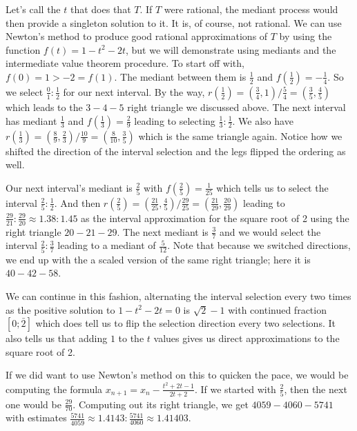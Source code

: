 \documentclass[12pt]{article}
\begin{document}
Let's call the $t$ that does that $T$. If $T$ were rational, the mediant process would then provide a singleton solution to it. It is, of course, not rational. We can use Newton's method to produce good rational approximations of $T$ by using the function $f(t) = 1-t^2 - 2t$, but we will demonstrate using mediants and the intermediate value theorem procedure. To start off with, $f(0) = 1 > -2 = f(1)$. The mediant between them is $\frac{1}{2}$ and $f(\frac{1}{2}) = -\frac{1}{4}$. So we select $\frac{0}{1}:\frac{1}{2}$ for our next interval. By the way, $r(\frac{1}{2}) = (\frac{3}{4}, 1) / \frac{5}{4} = (\frac{3}{5}, \frac{4}{5})$ which leads to the $3-4-5$ right triangle we discussed above.  The next interval has mediant $\frac{1}{3}$ and $f(\frac{1}{3}) = \frac{2}{9}$ leading to selecting $\frac{1}{3}:\frac{1}{2}$. We also have $r(\frac{1}{3}) = ( \frac{8}{9}, \frac{2}{3}) / \frac{10}{9} = (\frac{8}{10}, \frac{3}{5})$ which is the same triangle again. Notice how we shifted the direction of the interval selection and the legs flipped the ordering as well.

Our next interval's mediant is $\frac{2}{5}$ with $f(\frac{2}{5}) = \frac{1}{25}$ which tells us to select the interval $\frac{2}{5}:\frac{1}{2}$. And then $r(\frac{2}{5}) = (\frac{21}{25}, \frac{4}{5})/\frac{29}{25} = (\frac{21}{29}, \frac{20}{29})$ leading to $\frac{29}{21}:\frac{29}{20} \approx 1.38: 1.45$ as the interval approximation for the square root of 2 using the right triangle $20-21-29$. The next mediant is $\frac{3}{7}$ and we would select the interval $\frac{2}{5}:\frac{3}{7}$ leading to a mediant of $\frac{5}{12}$.  Note that because we switched directions, we end up with the a scaled version of the same right triangle; here it is $40-42-58$. 

We can continue in this fashion, alternating the interval selection every two times as the positive solution to $1 - t^2 - 2t = 0$ is $\sqrt{2}-1$ with continued fraction $[0;\bar{2}]$ which does tell us to flip the selection direction every two selections. It also tells us that adding $1$ to the $t$ values gives us direct approximations to the square root of 2. 

If we did want to use Newton's method on this to quicken the pace, we would be computing the formula $x_{n+1} = x_n - \frac{ t^2  + 2t -1}{2t + 2}$. If we started with $\frac{2}{5}$, then the next one would be $\frac{29}{70}$. Computing out its right triangle, we get $4059-4060-5741$ with estimates $\frac{5741}{4059}\approx 1.4143: \frac{5741}{4060} \approx 1.41403$. 
\end{document}
